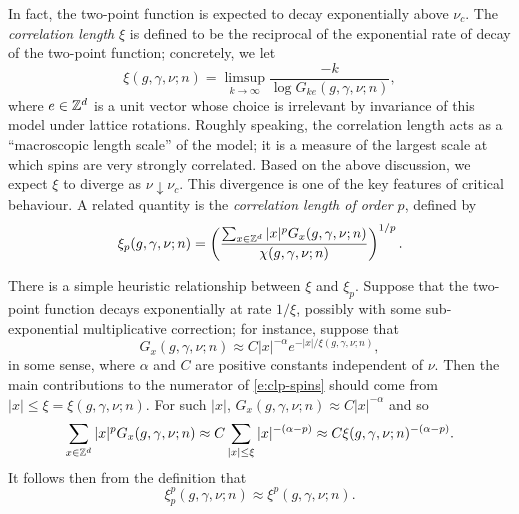 In fact, the two-point function is expected to decay exponentially above $\nu_c$.
The \emph{correlation length} $\xi$ is defined to be the reciprocal of the exponential
rate of decay of the two-point function; concretely, we let
\begin{equation}
\label{e:cl-spins}
\xi(g, \gamma, \nu; n) = \limsup_{k\to\infty} \frac{-k}{\log G_{ke}(g, \gamma, \nu; n)},
\end{equation}
where $e \in { {{\mathbb Z}}^d }$ is a unit vector whose choice is irrelevant by invariance of this model
under lattice rotations.
Roughly speaking, the correlation length acts as
a ``macroscopic length scale'' of the model; it is a measure of the largest scale at
which spins are very strongly correlated. Based on the above discussion, we expect $\xi$
to diverge as $\nu\downarrow\nu_c$. This divergence is one of the
key features of critical behaviour.
A related quantity is the \emph{correlation length of order $p$}, defined by
\begin{equation}
\label{e:clp-spins}
\xi_p(g, \gamma, \nu; n)
	=
\left(\frac{\sum_{x\in{ {{\mathbb Z}}^d }} |x|^p G_x(g, \gamma, \nu; n)}{\chi(g, \gamma, \nu; n)}\right)^{1/p}.
\end{equation}

\begin{rk}
There is a simple heuristic relationship between $\xi$ and $\xi_p$. Suppose that
the two-point function decays exponentially at rate $1/\xi$, possibly with some
sub-exponential multiplicative correction; for instance, suppose that
\begin{equation}
G_x(g, \gamma, \nu; n) \approx C |x|^{-\alpha} e^{-|x|/\xi(g, \gamma, \nu; n)},
\end{equation}
in some sense, where $\alpha$ and $C$ are positive constants independent of $\nu$.
Then the main contributions to the numerator of
\eqref{e:clp-spins} should come from $|x| \le \xi = \xi(g, \gamma, \nu; n)$. For such $|x|$,
$G_x(g, \gamma, \nu; n) \approx C |x|^{-\alpha}$ and so
\begin{equation}
\sum_{x\in{ {{\mathbb Z}}^d }} |x|^p G_x(g, \gamma, \nu; n)
	\approx
C \sum_{|x| \le \xi} |x|^{-(\alpha-p)}
	\approx
C \xi(g, \gamma, \nu; n)^{-(\alpha-p)}.
\end{equation}
It follows then from the definition that
\begin{equation}
\xi^p_p(g, \gamma, \nu; n) \approx \xi^p(g, \gamma, \nu; n).
\end{equation}
\end{rk}


